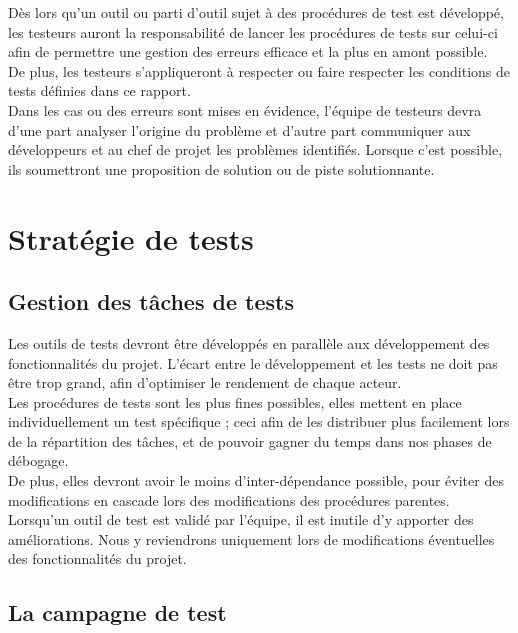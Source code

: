 \documentclass[a4paper,11pt,french]{article}
\begin{document}
Dès lors qu'un outil ou parti d'outil sujet à des procédures de test est développé, les testeurs auront la responsabilité de lancer les procédures de tests sur celui-ci afin de permettre une gestion des erreurs efficace et la plus en amont possible.  \\

De plus, les testeurs s'appliqueront à respecter ou faire respecter les conditions de tests définies dans ce rapport.\\

Dans les cas ou des erreurs sont mises en évidence, l'équipe de testeurs devra d'une part analyser l'origine du problème et d'autre part communiquer aux développeurs et au chef de projet les problèmes identifiés. Lorsque c'est possible, ils soumettront une proposition de solution ou de piste solutionnante.


\newpage
\section{Stratégie de tests}

\subsection{Gestion des tâches de tests}

Les outils de tests devront être développés en parallèle aux développement des fonctionnalités du projet. L'écart entre le développement et les tests ne doit pas être trop grand, afin d'optimiser le rendement de chaque acteur.\\

Les procédures de tests sont les plus fines possibles, elles mettent en place individuellement un test spécifique ; ceci afin de les distribuer plus facilement lors de la répartition des tâches, et de pouvoir gagner du temps dans nos phases de débogage. \\

De plus, elles devront avoir le moins d'inter-dépendance possible, pour éviter des modifications en cascade lors des modifications des procédures parentes.
Lorsqu'un outil de test est validé par l'équipe, il est inutile d'y apporter des améliorations. Nous y reviendrons uniquement lors de modifications éventuelles des fonctionnalités du projet.

\subsection{La campagne de test}
\end{document}
